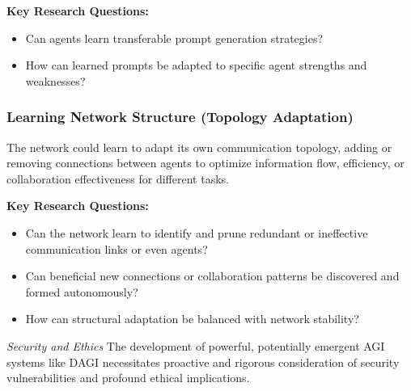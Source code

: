 \documentclass[12pt]{amsart}
\begin{document}
\textbf{Key Research Questions:}
\begin{itemize}[leftmargin=*, label={--}]
    \item Can agents learn transferable prompt generation strategies?
    \item How can learned prompts be adapted to specific agent strengths and weaknesses?
\end{itemize}

\subsubsection{Learning Network Structure (Topology Adaptation)}
\label{subsubsec:learn_structure}
The network could learn to adapt its own communication topology, adding or removing connections between agents to optimize information flow, efficiency, or collaboration effectiveness for different tasks.

\textbf{Key Research Questions:}
\begin{itemize}[leftmargin=*, label={--}]
    \item Can the network learn to identify and prune redundant or ineffective communication links or even agents?
    \item Can beneficial new connections or collaboration patterns be discovered and formed autonomously?
    \item How can structural adaptation be balanced with network stability?
\end{itemize}

\textit{Security and Ethics}
\label{subsec:security_ethics}
The development of powerful, potentially emergent AGI systems like DAGI necessitates proactive and rigorous consideration of security vulnerabilities and profound ethical implications.
\end{document}
